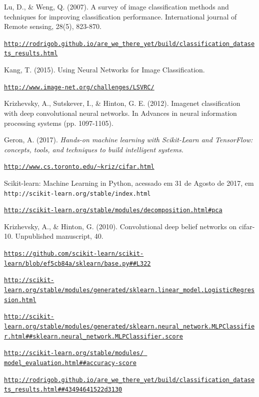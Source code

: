 \documentclass[conference]{IEEEtran}
\begin{document}
\begin{thebibliography}{00}

Lu, D., \& Weng, Q. (2007). A survey of image classification methods and techniques for improving classification performance. International journal of Remote sensing, 28(5), 823-870.

\texttt{\url{http://rodrigob.github.io/are_we_there_yet/build/classification_datasets_results.html}}

Kang, T. (2015). Using Neural Networks for Image Classification.

\texttt{\url{http://www.image-net.org/challenges/LSVRC/}
}

Krizhevsky, A., Sutskever, I., \& Hinton, G. E. (2012). Imagenet classification with deep convolutional neural networks. In Advances in neural information processing systems (pp. 1097-1105).

  Geron, A. (2017). \textit{Hands-on machine learning with Scikit-Learn and TensorFlow: concepts, tools, and techniques to build intelligent systems.}

 \texttt{\url{http://www.cs.toronto.edu/~kriz/cifar.html}}

 Scikit-learn: Machine Learning in Python, acessado em 31 de Agosto de 2017, em \texttt{http://scikit-learn.org/stable/index.html}

 \texttt{\url{http://scikit-learn.org/stable/modules/decomposition.html\#pca}}

 Krizhevsky, A., \& Hinton, G. (2010). Convolutional deep belief networks on cifar-10. Unpublished manuscript, 40.

 \texttt{\url{https://github.com/scikit-learn/scikit-learn/blob/ef5cb84a/sklearn/base.py##L322}}

 \texttt{\url{http://scikit-learn.org/stable/modules/generated/sklearn.linear_model.LogisticRegression.html}}

 \texttt{\url{http://scikit-learn.org/stable/modules/generated/sklearn.neural_network.MLPClassifier.html##sklearn.neural_network.MLPClassifier.score}}

 \texttt{\url{http://scikit-learn.org/stable/modules/ model_evaluation.html##accuracy-score}}

 \texttt{\url{http://rodrigob.github.io/are_we_there_yet/build/classification_datasets_results.html##43494641522d3130}}

\end{thebibliography}
\end{document}
